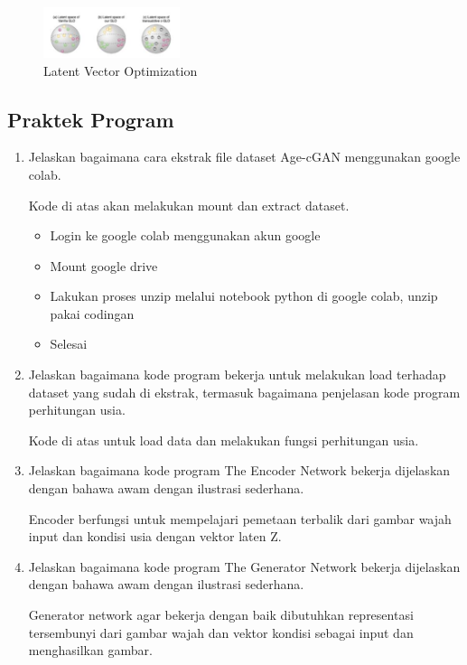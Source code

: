 \begin{enumerate}
	\begin{figure}[H]
		\includegraphics[width=4cm]{figures/1174087/9/teori11.PNG}
            	\centering
           	 \caption{Latent Vector Optimization}
       	 \end{figure}

\end{enumerate}

\subsection{Praktek Program}
\begin{enumerate}
	\item Jelaskan bagaimana cara ekstrak file dataset Age-cGAN menggunakan google colab.
	\hfill\break

	
	Kode di atas akan melakukan mount dan extract dataset.

	\begin{itemize}
		\item Login ke google colab menggunakan akun google
		\item Mount google drive
		\item Lakukan proses unzip melalui notebook python di google colab, unzip pakai codingan
		\item Selesai
	\end{itemize}

	\item Jelaskan bagaimana kode program bekerja untuk melakukan load terhadap dataset yang sudah di ekstrak, termasuk bagaimana penjelasan kode program perhitungan usia.
	\hfill\break
	
	Kode di atas untuk load data dan melakukan fungsi perhitungan usia.

	\item Jelaskan bagaimana kode program The Encoder Network bekerja dijelaskan dengan bahawa awam dengan ilustrasi sederhana.
	\hfill\break
	
	Encoder berfungsi untuk mempelajari pemetaan terbalik dari gambar wajah input dan kondisi usia dengan vektor laten Z.

	\item Jelaskan bagaimana kode program The Generator Network bekerja dijelaskan dengan bahawa awam dengan ilustrasi sederhana.
	\hfill\break
	
	Generator network agar bekerja dengan baik dibutuhkan representasi tersembunyi dari gambar wajah dan vektor kondisi sebagai input dan menghasilkan gambar.


\end{enumerate}
